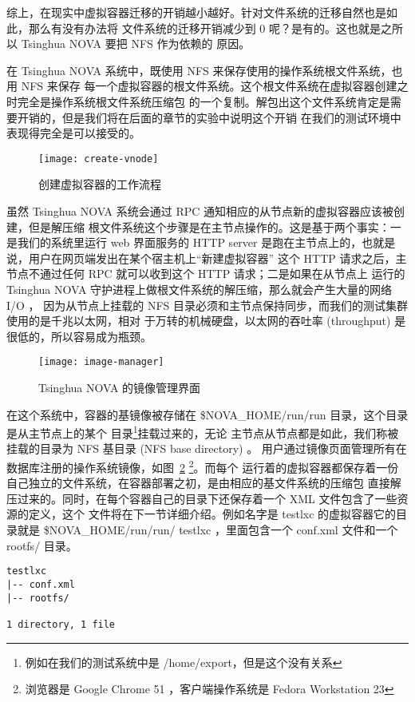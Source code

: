 综上，在现实中虚拟容器迁移的开销越小越好。针对文件系统的迁移自然也是如此，那么有没有办法将
文件系统的迁移开销减少到 0 呢？是有的。这也就是之所以 Tsinghua NOVA 要把 NFS 作为依赖的
原因。

在 Tsinghua NOVA 系统中，既使用 NFS 来保存使用的操作系统根文件系统，也用 NFS 来保存
每一个虚拟容器的根文件系统。这个根文件系统在虚拟容器创建之时完全是操作系统根文件系统压缩包
的一个复制。解包出这个文件系统肯定是需要开销的，但是我们将在后面的章节的实验中说明这个开销
在我们的测试环境中表现得完全是可以接受的。

\begin{figure}[t]
    \centering
    \texttt{[image: create-vnode]}
    \caption{创建虚拟容器的工作流程}
    \label{fig:create-vnode}
\end{figure}

虽然 Tsinghua NOVA 系统会通过 RPC 通知相应的从节点新的虚拟容器应该被创建，但是解压缩
根文件系统这个步骤是在主节点操作的。这是基于两个事实：一是我们的系统里运行 web 界面服务的
HTTP server 是跑在主节点上的，也就是说，用户在网页端发出在某个宿主机上“新建虚拟容器”
这个 HTTP 请求之后，主节点不通过任何 RPC 就可以收到这个 HTTP 请求；二是如果在从节点上
运行的 Tsinghua NOVA 守护进程上做根文件系统的解压缩，那么就会产生大量的网络 I/O ，
因为从节点上挂载的 NFS 目录必须和主节点保持同步，而我们的测试集群使用的是千兆以太网，相对
于万转的机械硬盘，以太网的吞吐率 (throughput) 是很低的，所以容易成为瓶颈。

\begin{figure}[H]
    \centering
    \texttt{[image: image-manager]}
    \caption{Tsinghua NOVA 的镜像管理界面}
    \label{fig:image-manager}
\end{figure}

在这个系统中，容器的基镜像被存储在 \$NOVA\_HOME/run/run 目录，这个目录是从主节点上的某个
目录\footnote{例如在我们的测试系统中是 /home/export，但是这个没有关系}挂载过来的，无论
主节点从节点都是如此，我们称被挂载的目录为 NFS 基目录 (NFS base directory) 。
用户通过镜像页面管理所有在数据库注册的操作系统镜像，如图~\ref{fig:image-manager}
\footnote{浏览器是 Google Chrome 51 ，客户端操作系统是 Fedora Workstation 23}。而每个
运行着的虚拟容器都保存着一份自己独立的文件系统，在容器部署之初，是由相应的基文件系统的压缩包
直接解压过来的。同时，在每个容器自己的目录下还保存着一个 XML 文件包含了一些资源的定义，这个
文件将在下一节详细介绍。例如名字是 testlxc 的虚拟容器它的目录就是 \$NOVA\_HOME/run/run/
testlxc ，里面包含一个 conf.xml 文件和一个 rootfs/ 目录。

\begin{lstlisting}
testlxc
|-- conf.xml
|-- rootfs/

1 directory, 1 file
\end{lstlisting}

